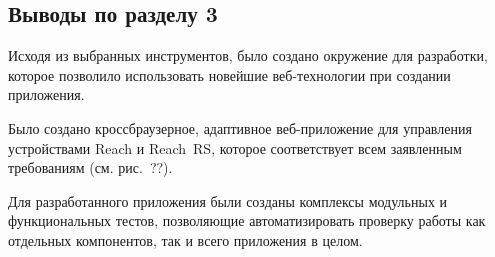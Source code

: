 \subsection{Выводы по разделу 3}

\begin{dashitemize}
  \item Исходя из выбранных инструментов, было создано окружение для разработки, которое позволило использовать новейшие веб-технологии при создании приложения.
  \item Было создано кроссбраузерное, адаптивное веб-приложение для управления устройствами Reach и Reach~RS, которое соответствует всем заявленным требованиям (см. рис.~??).
  \item Для разработанного приложения были созданы комплексы модульных и функциональных тестов, позволяющие автоматизировать проверку работы как отдельных компонентов, так и всего приложения в целом.
\end{dashitemize}

